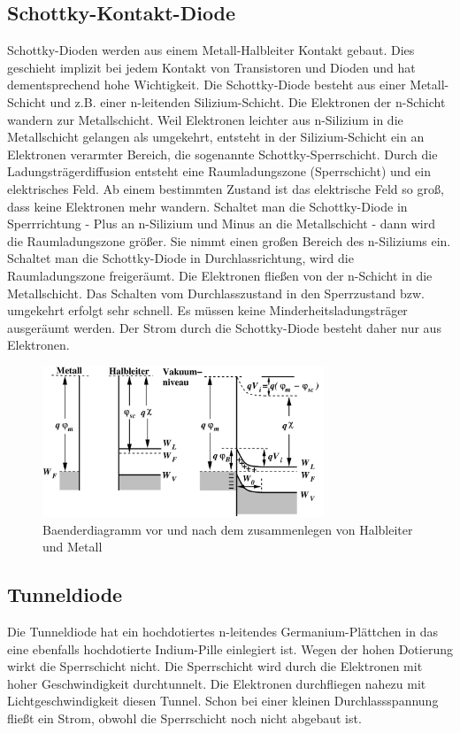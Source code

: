 \subsection{Schottky-Kontakt-Diode }\label{k5:schottky}
Schottky-Dioden werden aus einem Metall-Halbleiter Kontakt gebaut. Dies geschieht implizit bei jedem Kontakt von Transistoren und Dioden und hat dementsprechend hohe Wichtigkeit.
Die Schottky-Diode besteht aus einer Metall-Schicht und z.B. einer n-leitenden Silizium-Schicht. Die Elektronen der n-Schicht wandern zur Metallschicht. Weil Elektronen leichter aus n-Silizium in die Metallschicht gelangen als umgekehrt, entsteht in der Silizium-Schicht ein an Elektronen verarmter Bereich, die sogenannte Schottky-Sperrschicht. Durch die Ladungsträgerdiffusion entsteht eine Raumladungszone (Sperrschicht) und ein elektrisches Feld. Ab einem bestimmten Zustand ist das elektrische Feld so groß, dass keine Elektronen mehr wandern.
Schaltet man die Schottky-Diode in Sperrrichtung - Plus an n-Silizium und Minus an die Metallschicht - dann wird die Raumladungszone größer. Sie nimmt einen großen Bereich des n-Siliziums ein. Schaltet man die Schottky-Diode in Durchlassrichtung, wird die Raumladungszone freigeräumt. Die Elektronen fließen von der n-Schicht in die Metallschicht.
Das Schalten vom Durchlasszustand in den Sperrzustand bzw. umgekehrt erfolgt sehr schnell. Es müssen keine Minderheitsladungsträger ausgeräumt werden. Der Strom durch die Schottky-Diode besteht daher nur aus Elektronen.
\begin{figure}[h]
    \centering
    \includegraphics[width=0.75\textwidth]{fig/baenderSchottky}
    \caption{Baenderdiagramm vor und nach dem zusammenlegen von Halbleiter und Metall}
    \label{fig:baenderSchottky}
\end{figure}

\subsection{Tunneldiode }\label{k5:tunnelDiode}
Die Tunneldiode hat ein hochdotiertes n-leitendes Germanium-Plättchen in das eine ebenfalls hochdotierte Indium-Pille einlegiert ist.
Wegen der hohen Dotierung wirkt die Sperrschicht nicht. Die Sperrschicht wird durch die Elektronen mit hoher Geschwindigkeit durchtunnelt. Die Elektronen durchfliegen nahezu mit Lichtgeschwindigkeit diesen Tunnel. Schon bei einer kleinen Durchlassspannung fließt ein Strom, obwohl die Sperrschicht noch nicht abgebaut ist.

